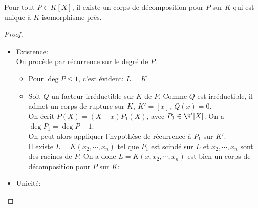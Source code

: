 \begin{theorem}
	Pour tout $P\in K[X]$, il existe un corps de décomposition pour $P$ sur $K$ qui est unique à $K$-isomorphisme près.
\end{theorem}

\begin{proof}
	\begin{itemize}
		\item Existence:\\
		      On procède par récurrence sur le degré de $P$.
		      \begin{itemize}
			      \item Pour $\deg P \leq 1$, c'est évident: $L = K$
			      \item Soit $Q$ un facteur irréductible sur $K$ de $P$.
			            Comme $Q$ est irréductible, il admet un corps de rupture sur $K, \ K' = [x], \ Q(x) = 0$.\\
			            On écrit $P(X) = (X-x)P_1(X)$, avec $P_1 \in \K'[X]$. On a $\deg P_1 = \deg P -1$.\\
			            On peut alors appliquer l'hypothèse de récurrence à $P_1$ sur $K'$.\\
			            Il existe $L = K(x_2, \cdots,  x_n)$ tel que $P_1$ est scindé sur $L$ et
			            $x_2, \cdots, x_n$ sont des racines de $P$. On a donc $L = K(x, x_2, \cdots, x_n)$ est bien un
			            corps de décomposition pour $P$ sur $K$:
		      \end{itemize}
		\item Unicité: %

	\end{itemize}
\end{proof}


